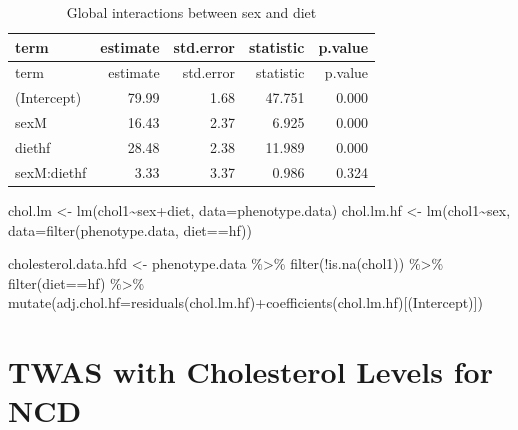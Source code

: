 \documentclass[
]{article}
\newenvironment{Shaded}{\begin{snugshade}}{\end{snugshade}}
\newcommand{\AttributeTok}[1]{\textcolor[rgb]{0.77,0.63,0.00}{#1}}
\newcommand{\FunctionTok}[1]{\textcolor[rgb]{0.00,0.00,0.00}{#1}}
\newcommand{\NormalTok}[1]{#1}
\newcommand{\OtherTok}[1]{\textcolor[rgb]{0.56,0.35,0.01}{#1}}
\newcommand{\SpecialCharTok}[1]{\textcolor[rgb]{0.00,0.00,0.00}{#1}}
\newcommand{\StringTok}[1]{\textcolor[rgb]{0.31,0.60,0.02}{#1}}
\begin{document}
\begin{longtable}[]{@{}lrrrr@{}}
\caption{Global interactions between sex and diet}\tabularnewline
\toprule()
term & estimate & std.error & statistic & p.value \\
\midrule()
\endfirsthead
\toprule()
term & estimate & std.error & statistic & p.value \\
\midrule()
\endhead
(Intercept) & 79.99 & 1.68 & 47.751 & 0.000 \\
sexM & 16.43 & 2.37 & 6.925 & 0.000 \\
diethf & 28.48 & 2.38 & 11.989 & 0.000 \\
sexM:diethf & 3.33 & 3.37 & 0.986 & 0.324 \\
\bottomrule()
\end{longtable}

\begin{Shaded}
\begin{Highlighting}[]
\NormalTok{chol.lm }\OtherTok{\textless{}{-}} \FunctionTok{lm}\NormalTok{(chol1}\SpecialCharTok{\textasciitilde{}}\NormalTok{sex}\SpecialCharTok{+}\NormalTok{diet, }\AttributeTok{data=}\NormalTok{phenotype.data)}
\NormalTok{chol.lm.hf }\OtherTok{\textless{}{-}} \FunctionTok{lm}\NormalTok{(chol1}\SpecialCharTok{\textasciitilde{}}\NormalTok{sex, }\AttributeTok{data=}\FunctionTok{filter}\NormalTok{(phenotype.data, diet}\SpecialCharTok{==}\StringTok{\textquotesingle{}hf\textquotesingle{}}\NormalTok{))}

\NormalTok{cholesterol.data.hfd }\OtherTok{\textless{}{-}}
\NormalTok{  phenotype.data }\SpecialCharTok{\%\textgreater{}\%}
    \FunctionTok{filter}\NormalTok{(}\SpecialCharTok{!}\FunctionTok{is.na}\NormalTok{(chol1)) }\SpecialCharTok{\%\textgreater{}\%}
  \FunctionTok{filter}\NormalTok{(diet}\SpecialCharTok{==}\StringTok{\textquotesingle{}hf\textquotesingle{}}\NormalTok{) }\SpecialCharTok{\%\textgreater{}\%}
  \FunctionTok{mutate}\NormalTok{(}\AttributeTok{adj.chol.hf=}\FunctionTok{residuals}\NormalTok{(chol.lm.hf)}\SpecialCharTok{+}\FunctionTok{coefficients}\NormalTok{(chol.lm.hf)[}\StringTok{\textquotesingle{}(Intercept)\textquotesingle{}}\NormalTok{])}
\end{Highlighting}
\end{Shaded}

\hypertarget{twas-with-cholesterol-levels-for-ncd}{%
\section{TWAS with Cholesterol Levels for
NCD}\label{twas-with-cholesterol-levels-for-ncd}}
\end{document}
